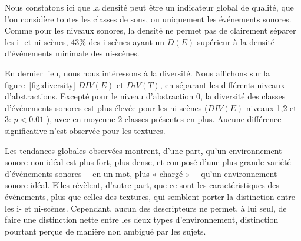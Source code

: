 Nous constatons ici que la densité peut être un indicateur global de qualité, que l'on considère toutes les classes de sons, ou uniquement les événements sonores. Comme pour les niveaux sonores, la densité ne permet pas de clairement séparer les i- et ni-scènes, $43\%$ des i-scènes ayant un $D(E)$ supérieur à la densité d'événements minimale des ni-scènes.

En dernier lieu, nous nous intéressons à la diversité. Nous affichons sur la figure~\ref{fig:diversity} $DIV(E)$ et $DiV(T)$, en séparant les différents niveaux d'abstractions. Excepté pour le niveau d'abstraction 0, la diversité des classes d'événements sonores est plus élevée pour les ni-scènes ($DIV(E)$ niveaux 1,2 et 3: $p<0.01$ ), avec en moyenne 2 classes présentes en plus. Aucune différence significative n'est observée pour les textures.

Les tendances globales observées montrent, d'une part, qu'un environnement sonore non-idéal est plus fort, plus dense, et composé d'une plus grande variété d'événements sonores ---en un mot, plus « chargé »--- qu'un environnement sonore idéal. Elles révèlent, d'autre part, que ce sont les caractéristiques des événements, plus que celles des textures, qui semblent porter la distinction entre les i- et ni-scènes. Cependant, aucun des descripteurs ne permet, à lui seul, de faire une distinction nette entre les deux types d'environnement, distinction pourtant perçue de manière non ambiguë par les sujets.

